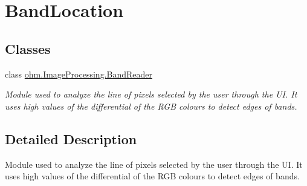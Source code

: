\hypertarget{group___band_location}{}\section{Band\+Location}
\label{group___band_location}
\subsection*{Classes}
\begin{DoxyCompactItemize}
\item 
class \hyperlink{classohm_1_1_image_processing_1_1_band_reader}{ohm.\+Image\+Processing.\+Band\+Reader}
\begin{DoxyCompactList}\small\item\em Module used to analyze the line of pixels selected by the user through the UI. It uses high values of the differential of the R\+GB colours to detect edges of bands. \end{DoxyCompactList}\end{DoxyCompactItemize}


\subsection{Detailed Description}
Module used to analyze the line of pixels selected by the user through the UI. It uses high values of the differential of the R\+GB colours to detect edges of bands. 